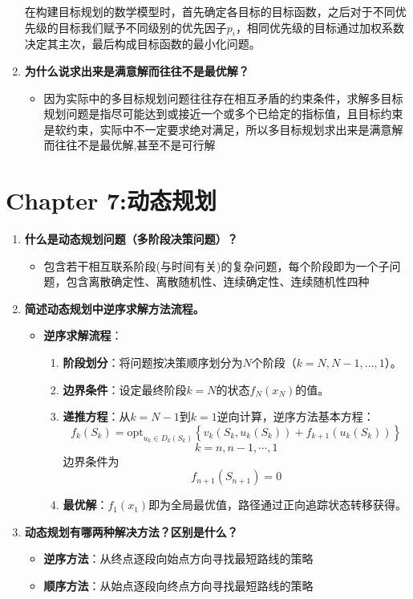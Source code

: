 \begin{enumerate}
		在构建目标规划的数学模型时，首先确定各目标的目标函数，之后对于不同优先级的目标我们赋予不同级别的优先因子$p_i$，相同优先级的目标通过加权系数决定其主次，最后构成目标函数的最小化问题。
		\item \textbf{为什么说求出来是满意解而往往不是最优解？}
		\begin{itemize}
			\item 因为实际中的多目标规划问题往往存在相互矛盾的约束条件，求解多目标规划问题是指尽可能达到或接近一个或多个已给定的指标值，且目标约束是软约束，实际中不一定要求绝对满足，所以多目标规划求出来是满意解而往往不是最优解,甚至不是可行解
		\end{itemize}
	\end{enumerate}
	\section{Chapter 7:动态规划}
		\begin{enumerate}
		\item \textbf{什么是动态规划问题（多阶段决策问题）？ }
		\begin{itemize}
			\item 包含若干相互联系阶段(与时间有关)的复杂问题，每个阶段即为一个子问题，包含离散确定性、离散随机性、连续确定性、连续随机性四种
		\end{itemize}
		\item \textbf{简述动态规划中逆序求解方法流程。}
		\begin{itemize}
			\item \textbf{逆序求解流程}：
			\begin{enumerate}
				\item \textbf{阶段划分}：将问题按决策顺序划分为$N$个阶段（$k=N,N-1,\dots,1$）。
				\item \textbf{边界条件}：设定最终阶段$k=N$的状态$f_N(x_N)$的值。
				\item \textbf{递推方程}：从$k=N-1$到$k=1$逆向计算，逆序方法基本方程：
				\[f_k(S_k) = \text{opt}_{u_k \in D_k(S_k)} \left\{ v_k(S_k, u_k(S_k)) + f_{k+1}(u_k(S_k)) \right\}\]
				\[k = n, n-1, \cdots, 1\]
				边界条件为\[f_{n+1}(S_{n+1}) = 0\]
				\item \textbf{最优解}：$f_1(x_1)$即为全局最优值，路径通过正向追踪状态转移获得。
			\end{enumerate}
		\end{itemize}
		\item \textbf{动态规划有哪两种解决方法？区别是什么？ }
		\begin{itemize}
			\item \textbf{逆序方法}：从终点逐段向始点方向寻找最短路线的策略
			\item \textbf{顺序方法}：从始点逐段向终点方向寻找最短路线的策略
		\end{itemize}
		\end{enumerate}
